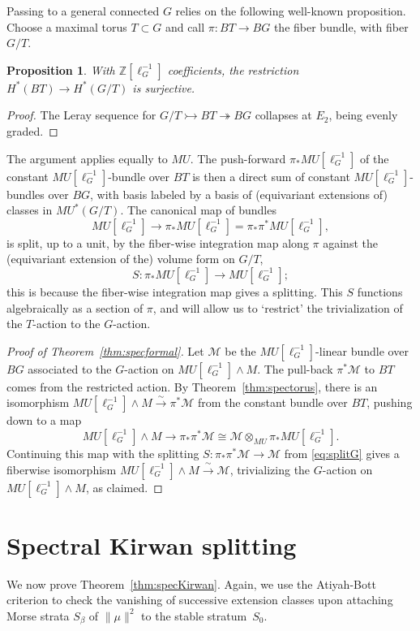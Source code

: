 \documentclass[11pt, reqno]{amsart}
\theoremstyle{plain}
\newtheorem{prop}[thm]{Proposition}
\theoremstyle{definition}
\begin{document}
Passing to a general connected $G$ relies on the following well-known proposition. 
Choose a maximal torus $T\subset G$ and call $\pi:BT\to BG$ the fiber bundle, with fiber $G/T$. 
\begin{prop}
With $\mathbb{Z}[\ell_G^{-1}]$ coefficients, the restriction $H^*(BT) \to H^*(G/T)$ is surjective. 
\end{prop}
\begin{proof}
The Leray sequence for $G/T \rightarrowtail BT \twoheadrightarrow BG$ collapses at $E_2$, being evenly graded. 
\end{proof}
\noindent
The argument applies equally to $MU$. The push-forward $\pi_*MU[\ell_G^{-1}]$ 
of the constant $MU[\ell_G^{-1}]$-bundle over $BT$ is then a direct sum of constant $MU[\ell_G^{-1}]$-bundles over $BG$, 
with basis labeled by a basis of (equivariant extensions of) classes in $MU^*(G/T)$. The canonical map of bundles
\[
MU[\ell_G^{-1}] \to \pi_*MU[\ell_G^{-1}] = \pi_*\pi^* MU[\ell_G^{-1}], 
\] 
is split, up to a unit, by the fiber-wise integration map along $\pi$ against 
the (equivariant extension of the) volume form on $G/T$,
\begin{equation}\label{eq:splitG}
S: \pi_*MU[\ell_G^{-1}] \to MU[\ell_G^{-1}];
\end{equation}
this is because the fiber-wise integration map gives a splitting. This $S$ functions 
algebraically as a section of $\pi$, and will allow us to `restrict' the trivialization 
of the $T$-action to the $G$-action.

\begin{proof}[Proof of Theorem~\ref{thm:specformal}] 
Let $\mathcal{M}$ be the $MU[\ell_G^{-1}]$-linear bundle over $BG$ 
associated to the $G$-action on 
$MU[\ell_G^{-1}] \wedge M$. The pull-back $\pi^*\mathcal{M}$ to 
$BT$ comes from the restricted action. By 
Theorem~\ref{thm:spectorus}, there is an isomorphism 
$MU[\ell_G^{-1}] \wedge M \xrightarrow{\ \sim\ } \pi^*\mathcal{M}$ 
from the constant bundle over $BT$, pushing down to a map 
\[
MU[\ell_G^{-1}] \wedge M \xrightarrow{\ \ } \pi_*\pi^*\mathcal{M} \cong \mathcal{M}\otimes_{MU} \pi_*MU[\ell_G^{-1}].
\] 
Continuing this map with the splitting $S: \pi_*\pi^*\mathcal{M} \to \mathcal{M}$ from \eqref{eq:splitG} gives a 
fiberwise isomorphism $MU[\ell_G^{-1}] \wedge M \xrightarrow{\ \sim\ }\mathcal{M}$, 
trivializing the $G$-action on $MU[\ell_G^{-1}] \wedge M$, as claimed.
\end{proof} 




\section{Spectral Kirwan splitting}
We now prove Theorem~\ref{thm:specKirwan}. Again, we use the Atiyah-Bott criterion 
to check the vanishing of successive extension classes upon attaching Morse strata 
$S_\beta$ of $\|\mu\|^2$ to the stable stratum~$S_0$. 
\end{document}
